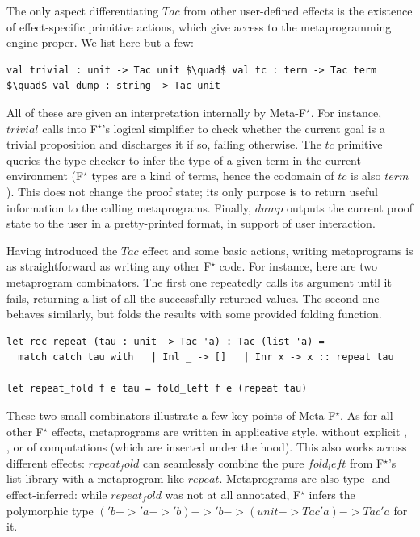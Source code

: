 \documentclass[runningheads]{llncs}
\newcommand\fstar{F$^\star$\xspace}
\newcommand\metafstar{Meta-F$^\star$\xspace}
\begin{document}
The only aspect differentiating \ls$Tac$ from other
user-defined effects is the existence of effect-specific primitive actions,
which give access to the metaprogramming engine proper.
%
We list here but a few:
%
\begin{lstlisting}
val trivial : unit -> Tac unit $\quad$ val tc : term -> Tac term $\quad$ val dump : string -> Tac unit
\end{lstlisting}
%
All of these are given an interpretation internally by \metafstar.
%
For instance, \ls$trivial$ calls into \fstar's logical simplifier to check
whether the current goal %
is a
trivial proposition and discharges it if so, failing otherwise.
%
The \ls$tc$ primitive queries the type-checker
to infer the type of a given term in the current %
environment
(\fstar types are a kind of terms, hence the codomain of \ls$tc$ is also \ls$term$).
%
This does not change the proof state; its only purpose
is to return useful information to the calling metaprograms.
%
Finally, \ls$dump$ outputs the current proof state to the user in a
pretty-printed format, in support of user interaction.


Having introduced the \ls$Tac$ effect and some basic actions,
writing metaprograms is as straightforward as writing any other \fstar
code.
%
For instance, here are two metaprogram combinators.
The first one repeatedly
calls its argument until it fails, returning a list of all the
successfully-returned values. The second one behaves similarly,
but folds the results with some provided folding function.
%
\begin{lstlisting}
let rec repeat (tau : unit -> Tac 'a) : Tac (list 'a) =
  match catch tau with   | Inl _ -> []   | Inr x -> x :: repeat tau

let repeat_fold f e tau = fold_left f e (repeat tau)
\end{lstlisting}
 
These two small combinators illustrate a few key points
of \metafstar.
%
As for all other \fstar effects, metaprograms are written in
applicative style, without explicit , , or 
of computations (which are inserted under the hood).
%
This also works across different effects: \ls$repeat_fold$ can seamlessly combine
the pure \ls$fold_left$ from \fstar's list library with a metaprogram
like \ls$repeat$.
%
Metaprograms are also type- and effect-inferred: while
\ls$repeat_fold$ was not at all annotated, \fstar infers the polymorphic
type
\ls$('b -> 'a -> 'b) -> 'b -> (unit -> Tac 'a) -> Tac 'a$
for it.
%
\end{document}
